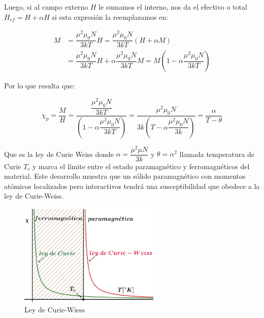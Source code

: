 Luego, si al campo externo $H$ le sumamos el interno, nos da el efectivo o total $H_{ef}=H+\alpha H$ si esta expresión la reemplazamos en:

\begin{equation}
\begin{aligned}
M &= \dfrac{\mu^{2}\mu_{0}N}{3kT}H =\dfrac{\mu^{2}\mu_{0}N}{3kT}(H+\alpha M) \\
  &= \dfrac{\mu^{2}\mu_{0}N}{3kT}H+ \alpha\dfrac{\mu^{2}\mu_{0}N}{3kT}M
  = M\left(1-\alpha\dfrac{\mu^{2}\mu_{0}N}{3kT} \right)
\end{aligned}
\end{equation}

Por lo que resulta que:

\begin{equation}
  \chi_{p}=\dfrac{M}{H}= \dfrac{\dfrac{\mu^{2}\mu_{0}N}{3kT}}{\left(1-\alpha\dfrac{\mu^{2}\mu_{0}N}{3kT} \right)}=\dfrac{\mu^{2}\mu_{0}N}{3k \left(T-\alpha\dfrac{\mu^{2}\mu_{0}N}{3k} \right)}= \dfrac{\alpha}{T-\theta}
\end{equation} 

Que es la ley de Curie Weiss donde $\alpha=\dfrac{\mu^{2}\mu N}{3k}$ y $\theta=\alpha^{2}$ llamada temperatura de Curie $T_{c}$ y marca el límite entre el estado paramagnético y ferromagnéticos del material. Este desarrollo muestra que un sólido paramagnético con momentos atómicos  localizados pero interactivos tendrá una susceptibilidad que obedece a la ley de Curie-Weiss.

\begin{figure}[H]
    \centering
    \includegraphics[width=0.6\textwidth]{./Figures/fig_c3}
	\caption{Ley de Curie-Wiess}
	\label{fig:c3}
\end{figure}
